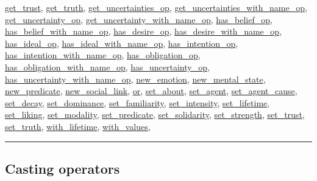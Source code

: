 \documentclass[]{book}
\theoremstyle{definition}
\theoremstyle{definition}
\theoremstyle{definition}
\theoremstyle{remark}
\begin{document}
\href{OperatorsDH\#get_trust}{get\_trust},
\href{OperatorsDH\#get_truth}{get\_truth},
\href{OperatorsDH\#get_uncertainties_op}{get\_uncertainties\_op},
\href{OperatorsDH\#get_uncertainties_with_name_op}{get\_uncertainties\_with\_name\_op},
\href{OperatorsDH\#get_uncertainty_op}{get\_uncertainty\_op},
\href{OperatorsDH\#get_uncertainty_with_name_op}{get\_uncertainty\_with\_name\_op},
\href{OperatorsDH\#has_belief_op}{has\_belief\_op},
\href{OperatorsDH\#has_belief_with_name_op}{has\_belief\_with\_name\_op},
\href{OperatorsDH\#has_desire_op}{has\_desire\_op},
\href{OperatorsDH\#has_desire_with_name_op}{has\_desire\_with\_name\_op},
\href{OperatorsDH\#has_ideal_op}{has\_ideal\_op},
\href{OperatorsDH\#has_ideal_with_name_op}{has\_ideal\_with\_name\_op},
\href{OperatorsDH\#has_intention_op}{has\_intention\_op},
\href{OperatorsDH\#has_intention_with_name_op}{has\_intention\_with\_name\_op},
\href{OperatorsDH\#has_obligation_op}{has\_obligation\_op},
\href{OperatorsDH\#has_obligation_with_name_op}{has\_obligation\_with\_name\_op},
\href{OperatorsDH\#has_uncertainty_op}{has\_uncertainty\_op},
\href{OperatorsDH\#has_uncertainty_with_name_op}{has\_uncertainty\_with\_name\_op},
\href{OperatorsNR\#new_emotion}{new\_emotion},
\href{OperatorsNR\#new_mental_state}{new\_mental\_state},
\href{OperatorsNR\#new_predicate}{new\_predicate},
\href{OperatorsNR\#new_social_link}{new\_social\_link},
\href{OperatorsNR\#or}{or}, \href{OperatorsSZ\#set_about}{set\_about},
\href{OperatorsSZ\#set_agent}{set\_agent},
\href{OperatorsSZ\#set_agent_cause}{set\_agent\_cause},
\href{OperatorsSZ\#set_decay}{set\_decay},
\href{OperatorsSZ\#set_dominance}{set\_dominance},
\href{OperatorsSZ\#set_familiarity}{set\_familiarity},
\href{OperatorsSZ\#set_intensity}{set\_intensity},
\href{OperatorsSZ\#set_lifetime}{set\_lifetime},
\href{OperatorsSZ\#set_liking}{set\_liking},
\href{OperatorsSZ\#set_modality}{set\_modality},
\href{OperatorsSZ\#set_predicate}{set\_predicate},
\href{OperatorsSZ\#set_solidarity}{set\_solidarity},
\href{OperatorsSZ\#set_strength}{set\_strength},
\href{OperatorsSZ\#set_trust}{set\_trust},
\href{OperatorsSZ\#set_truth}{set\_truth},
\href{OperatorsSZ\#with_lifetime}{with\_lifetime},
\href{OperatorsSZ\#with_values}{with\_values},

\begin{center}\rule{0.5\linewidth}{\linethickness}\end{center}

\subsection{Casting operators}\label{casting-operators-4}
\end{document}
